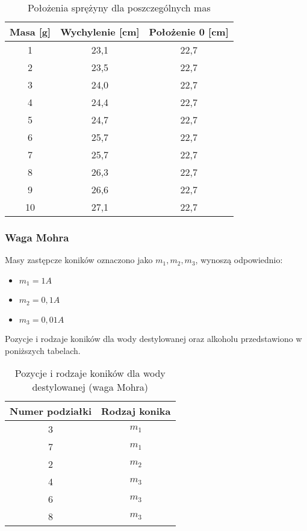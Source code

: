 \documentclass[a4paper,12pt]{article}
\begin{document}
\begin{table}[H]
    \centering
    \begin{tabular}{|c|c|c|}
        \hline
        \textbf{Masa [g]} & \textbf{Wychylenie [cm]} & \textbf{Położenie 0 [cm]} \\
        \hline
        1  & 23{,}1 & 22{,}7 \\
        2  & 23{,}5 & 22{,}7 \\
        3  & 24{,}0 & 22{,}7 \\
        4  & 24{,}4 & 22{,}7 \\
        5  & 24{,}7 & 22{,}7 \\
        6  & 25{,}7 & 22{,}7 \\
        7  & 25{,}7 & 22{,}7 \\
        8  & 26{,}3 & 22{,}7 \\
        9  & 26{,}6 & 22{,}7 \\
        10 & 27{,}1 & 22{,}7 \\
        \hline
    \end{tabular}
    \caption{Położenia sprężyny dla poszczególnych mas}
    \label{tab:pozycje_sprężyny}
\end{table}

\subsubsection*{Waga Mohra}

Masy zastępcze koników oznaczono jako $m_1, m_2, m_3$, wynoszą odpowiednio:

\begin{itemize}
    \item $m_1 = 1A$
    \item $m_2 = 0{,}1 A$
    \item $m_3 = 0{,}01 A$
\end{itemize}

Pozycje i rodzaje koników dla wody destylowanej oraz alkoholu przedstawiono w poniższych tabelach.

\begin{table}[H]
    \centering
    \begin{tabular}{|c|c|}
        \hline
        Numer podziałki & Rodzaj konika \\
        \hline
        3 & $m_1$ \\
        7 & $m_1$ \\
        2 & $m_2$ \\
        4 & $m_3$ \\
        6 & $m_3$ \\
        8 & $m_3$ \\
        \hline
    \end{tabular}
    \caption{Pozycje i rodzaje koników dla wody destylowanej (waga Mohra)}
    \label{tab:waga_mohra_woda}
\end{table}
\end{document}
